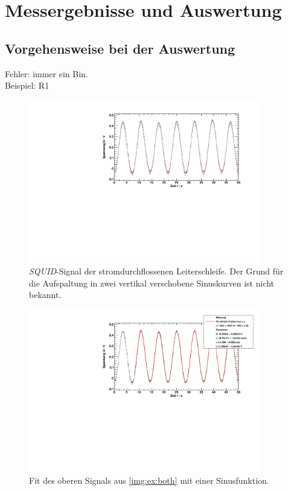 \section{Messergebnisse und Auswertung}

\subsection{Vorgehensweise bei der Auswertung}
Fehler: immer ein Bin.\\
Beispiel: R1
\begin{figure}[H]
\begin{center}
  \includegraphics[width=0.9\textwidth]{../img/both_Spule_R1.pdf}
  \caption{\emph{SQUID}-Signal der stromdurchflossenen Leiterschleife.
  Der Grund für die Aufspaltung in zwei vertikal verschobene Sinuskurven ist nicht bekannt.}
  \label{img:ex:both}
\end{center}
\end{figure}

\begin{figure}[H]
\begin{center}
  \includegraphics[width=0.9\textwidth]{../img/fit_Spule_R1.pdf}
  \caption{Fit des oberen Signals aus \autoref{img:ex:both} mit einer Sinusfunktion.}
  \label{img:ex:fit}
\end{center}
\end{figure}



